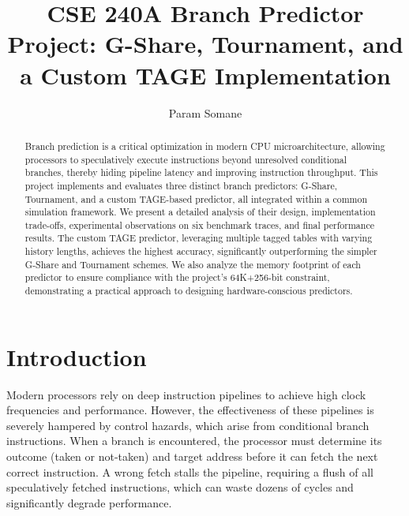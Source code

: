 \documentclass[sigconf, screen]{acmart}
\begin{document}
\title{CSE 240A Branch Predictor Project: G-Share, Tournament, and a Custom TAGE Implementation}

\author{Param Somane}


\begin{abstract}
Branch prediction is a critical optimization in modern CPU microarchitecture, allowing processors to speculatively execute instructions beyond unresolved conditional branches, thereby hiding pipeline latency and improving instruction throughput. This project implements and evaluates three distinct branch predictors: G-Share, Tournament, and a custom TAGE-based predictor, all integrated within a common simulation framework. We present a detailed analysis of their design, implementation trade-offs, experimental observations on six benchmark traces, and final performance results. The custom TAGE predictor, leveraging multiple tagged tables with varying history lengths, achieves the highest accuracy, significantly outperforming the simpler G-Share and Tournament schemes. We also analyze the memory footprint of each predictor to ensure compliance with the project's 64K+256-bit constraint, demonstrating a practical approach to designing hardware-conscious predictors.
\end{abstract}


\maketitle

\section{Introduction}
Modern processors rely on deep instruction pipelines to achieve high clock frequencies and performance. However, the effectiveness of these pipelines is severely hampered by control hazards, which arise from conditional branch instructions. When a branch is encountered, the processor must determine its outcome (taken or not-taken) and target address before it can fetch the next correct instruction. A wrong fetch stalls the pipeline, requiring a flush of all speculatively fetched instructions, which can waste dozens of cycles and significantly degrade performance.
\end{document}
